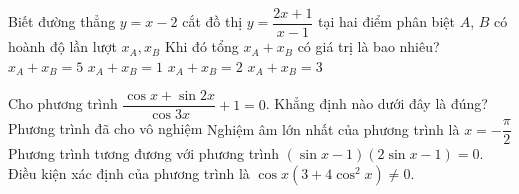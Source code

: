 \begin{ex}%
		Biết đường thẳng $y=x-2$ cắt đồ thị $y=\dfrac{2x+1}{x-1}$ tại hai điểm phân biệt $A$, $B$ có hoành độ lần lượt $x_A,x_B$ Khi đó tổng $x_A+x_B$ có giá trị là bao nhiêu?
		\choice
		{\True $x_A+x_B=5$}
		{$x_A+x_B=1$}
		{$x_A+x_B=2$}
		{$x_A+x_B=3$}
	\end{ex}
\begin{ex}%
		Cho phương trình $\dfrac{\cos x+\sin 2x}{\cos 3x}+1=0$. Khẳng định nào dưới đây là đúng?
		\choice
		{\True Phương trình đã cho vô nghiệm}
		{Nghiệm âm lớn nhất của phương trình là $x=-\dfrac{\pi}{2}$}
		{Phương trình tương đương với phương trình $\left( \sin x-1\right)\left(2\sin x-1\right)=0$.}
		{Điều kiện xác định của phương trình là $\cos x (3+4\cos^2x)\ne 0$.
		}
	\end{ex}
